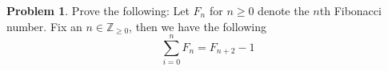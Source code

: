 \documentclass{article}
\newcommand{\ZZ}{\mathbb{Z}_{\geq 0}}
\theoremstyle{plain}
\theoremstyle{definition}
\newtheorem{problem}{Problem}
\begin{document}
\begin{problem}
    Prove the following: Let \(F_n\) for \(n \geq 0\) denote the \(n\)th Fibonacci number. Fix an \(n \in \ZZ\), then we have the following
    \[\sum_{i = 0}^n F_n = F_{n+2} - 1\]
\end{problem}





\end{document}
